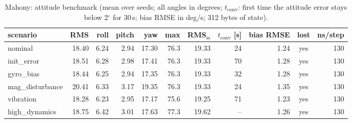 \begin{table}[H]\centering\footnotesize\setlength{\tabcolsep}{3.5pt}\caption{Mahony: attitude benchmark (mean over seeds; all angles in degrees; $t_\mathrm{conv}$: first time the attitude error stays below 2$^\circ$ for 30\,s; bias RMSE in deg/s; 312 bytes of state).}\label{tab:imu_Mahony}
\begin{tabular}{lrrrrrrrrcr}\toprule scenario & RMS & roll & pitch & yaw & max & RMS$_\mathrm{ss}$ & $t_\mathrm{conv}$ [s] & bias RMSE & lost & ns/step \\ \midrule
nominal & 18.40 & 6.24 & 2.94 & 17.30 & 76.3 & 19.33 & 24 & 1.24 & yes & 130 \\
init\_error & 18.51 & 6.28 & 2.98 & 17.41 & 76.3 & 19.33 & 70 & 1.28 & yes & 130 \\
gyro\_bias & 18.44 & 6.25 & 2.94 & 17.35 & 76.3 & 19.33 & 32 & 1.28 & yes & 130 \\
mag\_disturbance & 20.41 & 6.33 & 3.17 & 19.35 & 76.3 & 19.33 & 24 & 1.35 & yes & 130 \\
vibration & 18.28 & 6.23 & 2.95 & 17.17 & 75.6 & 19.25 & 71 & 1.23 & yes & 130 \\
high\_dynamics & 18.75 & 6.42 & 3.01 & 17.63 & 77.3 & 19.62 & -- & 1.26 & yes & 130 \\
\bottomrule\end{tabular}\end{table}
